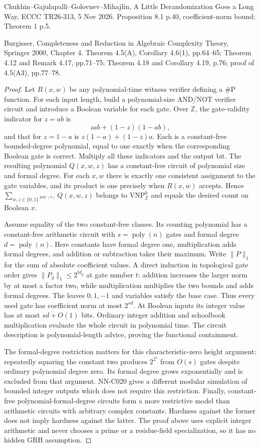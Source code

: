 Chukhin--Gajulapalli--Golovnev--Mihajlin, A Little Derandomization Goes a Long Way, ECCC TR26-313, 5 Nov 2026. Proposition 8.1 p.40, coefficient-norm bound; Theorem 1 p.5.

Burgisser, Completeness and Reduction in Algebraic Complexity Theory, Springer 2000, Chapter 4. Theorem 4.5(A), Corollary 4.6(1), pp.64--65; Theorem 4.12 and Remark 4.17, pp.71--75; Theorem 4.18 and Corollary 4.19, p.76; proof of 4.5(A3), pp.77--78.

\begin{proof}
Let $R(x,w)$ be any polynomial-time witness verifier defining a $\#\mathrm P$ function. For each input length, build a polynomial-size AND/NOT verifier circuit and introduce a Boolean variable for each gate. Over $\mathbb Z$, the gate-validity indicator for $z=ab$ is
\[
 zab+(1-z)(1-ab),
\]
and that for $z=1-a$ is $z(1-a)+(1-z)a$. Each is a constant-free bounded-degree polynomial, equal to one exactly when the corresponding Boolean gate is correct. Multiply all these indicators and the output bit. The resulting polynomial $Q(x,w,z)$ has a constant-free circuit of polynomial size and formal degree. For each $x,w$ there is exactly one consistent assignment to the gate variables, and its product is one precisely when $R(x,w)$ accepts. Hence $\sum_{w,z\in\{0,1\}^{\operatorname{poly}(n)}}Q(x,w,z)$ belongs to $\mathrm{VNP}_{\mathbb Z}^{0}$ and equals the desired count on Boolean $x$.

Assume equality of the two constant-free classes. Its counting polynomial has a constant-free arithmetic circuit with $s=\operatorname{poly}(n)$ gates and formal degree $d=\operatorname{poly}(n)$. Here constants have formal degree one, multiplication adds formal degrees, and addition or subtraction takes their maximum. Write $\|P\|_1$ for the sum of absolute coefficient values. A direct induction in topological gate order gives $\|P_g\|_1\leq2^{t d_g}$ at gate number $t$: addition increases the larger norm by at most a factor two, while multiplication multiplies the two bounds and adds formal degrees. The leaves $0,1,-1$ and variables satisfy the base case. Thus every used gate has coefficient norm at most $2^{sd}$. At Boolean inputs its integer value has at most $sd+O(1)$ bits. Ordinary integer addition and schoolbook multiplication evaluate the whole circuit in polynomial time. The circuit description is polynomial-length advice, proving the functional containment.

The formal-degree restriction matters for this characteristic-zero height argument: repeatedly squaring the constant two produces $2^{2^s}$ from $O(s)$ gates despite ordinary polynomial degree zero. Its formal degree grows exponentially and is excluded from that argument. NN-C020 gives a different modular simulation of bounded integer outputs which does not require this restriction. Finally, constant-free polynomial-formal-degree circuits form a more restrictive model than arithmetic circuits with arbitrary complex constants. Hardness against the former does not imply hardness against the latter. The proof above uses explicit integer arithmetic and never chooses a prime or a residue-field specialization, so it has no hidden GRH assumption.
\end{proof}
